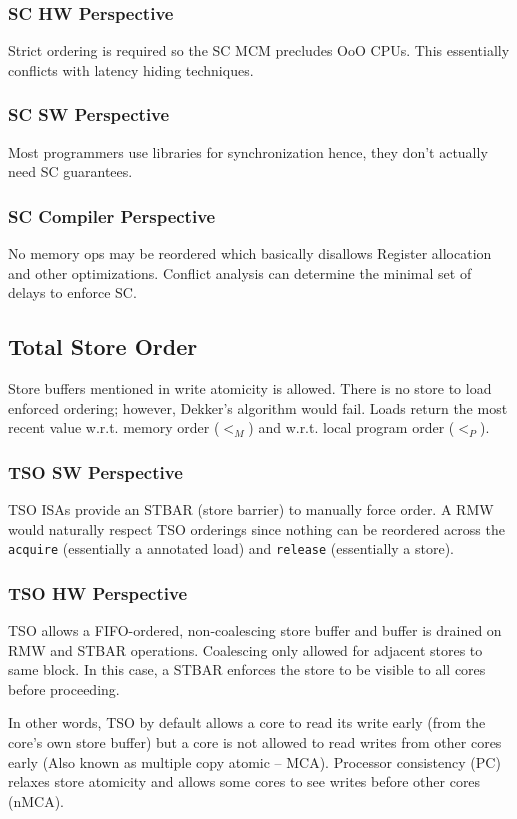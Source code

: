 \documentclass{article}
\begin{document}
\begin{multicols*}{2}
\subsubsection{SC HW Perspective}
Strict ordering is required so the SC MCM precludes OoO CPUs. This essentially conflicts with latency hiding techniques.

\subsubsection{SC SW Perspective}
Most programmers use libraries for synchronization hence, they don’t actually need SC guarantees.

\subsubsection{SC Compiler Perspective}
No memory ops may be reordered which basically disallows Register allocation and other optimizations. Conflict analysis can determine the minimal set of delays to enforce SC.

\subsection{Total Store Order}
Store buffers mentioned in write atomicity is allowed. There is no store to load enforced ordering; however, Dekker's algorithm would fail. Loads return the most recent value w.r.t. memory order ($<_M$) and w.r.t. local program order ($<_P$).

\subsubsection{TSO SW Perspective}
TSO ISAs provide an STBAR (store barrier) to manually force order. A RMW would naturally respect TSO orderings since nothing can be reordered across the \texttt{acquire} (essentially a annotated load) and \texttt{release} (essentially a store).

\subsubsection{TSO HW Perspective}
TSO allows a FIFO-ordered, non-coalescing store buffer and buffer is drained on RMW and STBAR operations. Coalescing only allowed for adjacent stores to same block. In this case, a STBAR enforces the store to be visible to all cores before proceeding. 
\medskip\par\noindent
In other words, TSO by default allows a core to read its write early (from the core's own store buffer) but a core is not allowed to read writes from other cores early (Also known as multiple copy atomic -- MCA). Processor consistency (PC) relaxes store atomicity and allows some cores to see writes before other cores (nMCA).


\end{multicols*}
\end{document}
